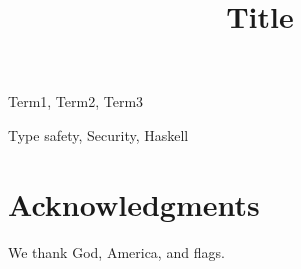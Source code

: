 \documentclass{sigplanconf}
\begin{document}
\conferenceinfo{} {}
\CopyrightYear{}
\copyrightdata{}

\title{Title}
\authorinfo{}
           {}
           {}
\date{}

\maketitle



\category{}{}{}

\terms
Term1, Term2, Term3

\keywords
Type safety, Security, Haskell












\section*{Acknowledgments}
We thank God, America, and flags.



\end{document}
